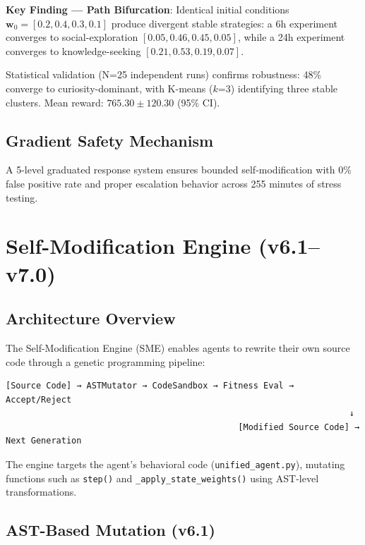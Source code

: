 \documentclass[11pt]{article}
\begin{document}
\textbf{Key Finding --- Path Bifurcation}: Identical initial conditions $\mathbf{w}_0 = [0.2, 0.4, 0.3, 0.1]$ produce divergent stable strategies: a 6h experiment converges to social-exploration $[0.05, 0.46, 0.45, 0.05]$, while a 24h experiment converges to knowledge-seeking $[0.21, 0.53, 0.19, 0.07]$.

Statistical validation (N=25 independent runs) confirms robustness: 48\% converge to curiosity-dominant, with K-means ($k$=3) identifying three stable clusters. Mean reward: $765.30 \pm 120.30$ (95\% CI).

\subsection{Gradient Safety Mechanism}

A 5-level graduated response system ensures bounded self-modification with 0\% false positive rate and proper escalation behavior across 255 minutes of stress testing.


\section{Self-Modification Engine (v6.1--v7.0)}

\subsection{Architecture Overview}

The Self-Modification Engine (SME) enables agents to rewrite their own source code through a genetic programming pipeline:

\begin{verbatim}
[Source Code] → ASTMutator → CodeSandbox → Fitness Eval → Accept/Reject
                                                                    ↓
                                              [Modified Source Code] → Next Generation
\end{verbatim}

The engine targets the agent's behavioral code (\texttt{unified\_agent.py}), mutating functions such as \texttt{step()} and \texttt{\_apply\_state\_weights()} using AST-level transformations.

\subsection{AST-Based Mutation (v6.1)}
\end{document}
